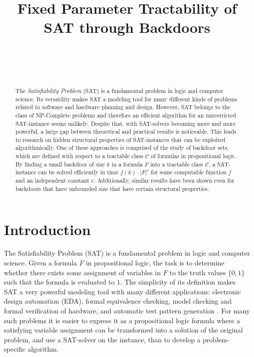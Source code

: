 \documentclass[11pt,a4paper]{article}
\title{Fixed Parameter Tractability of SAT through Backdoors}
\author{
 \authorname{Rupert Ettrich} \\
 \studentnumber{01129393} \\
 \curriculum{066 931 Logic and Computation} \\
 \email{rupert.ettrich@gmail.com}
}
\theoremstyle{definition}
\theoremstyle{proposition}
\begin{document}
\maketitle

\begin{abstract}
The \emph{Satisfiability Problem} (SAT) is a fundamental problem in logic and computer science. Its versatility makes SAT a modeling tool for many different kinds of problems related to software and hardware planning and design. However, SAT belongs to the class of NP-Complete problems and therefore an efficient algorithm for an unrestricted SAT-instance seems unlikely. Despite that, with SAT-solvers becoming more and more powerful, a large gap between theoretical and practical results is noticeable. This leads to research on hidden structural properties of SAT-instances that can be exploited algorithmically. One of these approaches is comprised of the study of backdoor sets, which are defined with respect to a tractable class $\mathcal{C}$ of formulas in propositional logic. By finding a small backdoor of size $k$ in a formula $F$ into a tractable class $\mathcal{C}$, a SAT-instance can be solved efficiently in time $f(k) \cdot |F|^c$ for some computable function $f$ and an independent constant $c$. Additionally, similar results have been shown even for backdoors that have unbounded size that have certain structural properties.
\end{abstract}

\section{Introduction}

The Satisfiability Problem (SAT) is a fundamental problem in logic and computer science. Given a formula $F$ in propositional logic, the task is to determine whether there exists some assignment of variables in $F$ to the truth values $\{0,1\}$ such that the formula is evaluated to $1$. The simplicity of its definition makes SAT a very powerful modeling tool with many different applications: electronic design automation (EDA), formal equivalence checking, model checking and formal verification of hardware, and automatic test pattern generation \cite{DBLP:journals/pieee/VizelWM15}. For many such problems it is easier to express it as a propositional logic formula where a satisfying variable assignment can be transformed into a solution of the original problem, and use a SAT-solver on the instance, than to develop a problem-specific algorithm. 
\end{document}
